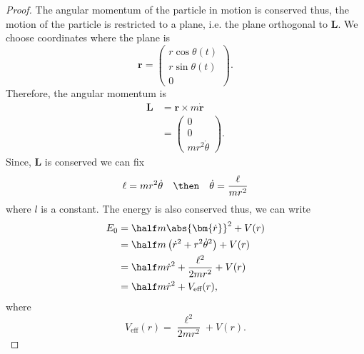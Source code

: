 \documentclass[12pt, a4paper]{article}
\begin{document}
\begin{proof}
    The angular momentum of the particle in motion is conserved thus, the motion of the particle is restricted to a plane, i.e.
    the plane orthogonal to \(\bm{L}\). We choose coordinates where the plane is 
    \[\bm{r} = \begin{pmatrix} r\cos\theta(t) \\ r\sin\theta(t) \\ 0 \end{pmatrix}.\]
    Therefore, the angular momentum is 
    \[\begin{aligned}
        \bm{L} &= \bm{r} \times m\bm{\dot{r}} \\
        &= \begin{pmatrix}
            0 \\ 0 \\ mr^2 \dot{\theta}
        \end{pmatrix}.
    \end{aligned}\]
    Since, \(\bm{L}\) is conserved we can fix 
    \[\ell=mr^2 \dot{\theta} \quad \then \quad \dot{\theta}=\frac{\ell}{mr^2}\]
    where \(l\) is a constant. The energy is also conserved thus, we can write 
    \[\begin{aligned}
        E_0 &= \half m \abs{\bm{\dot{r}}}^2 +V(r) \\
        &= \half m \left( \dot{r}^2+r^2\dot{\theta}^2 \right) +V(r) \\
        &= \half m \dot{r}^2 + \frac{\ell^2}{2mr^2} +V(r) \\
        &= \half m \dot{r}^2 + V_{\text{eff}}(r),
    \end{aligned}\]
    where 
    \[V_{\text{eff}}(r) = \frac{\ell^2}{2mr^2} +V(r).\]
\end{proof}


\end{document}

